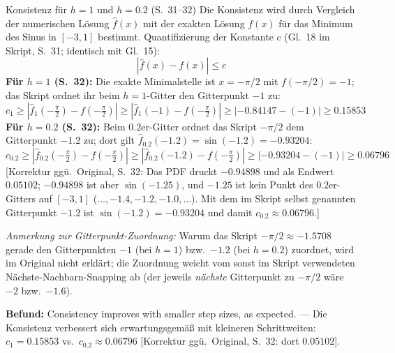 \begin{bspbox}{Konsistenz für $h=1$ und $h=0.2$ (S.~31--32)}
Die Konsistenz wird durch Vergleich der numerischen Lösung $\hat{f}(x)$ mit der exakten Lösung $f(x)$ für das Minimum des Sinus in $[-3,1]$ bestimmt. Quantifizierung der Konstante $c$ (Gl.~18 im Skript, S.~31; identisch mit Gl.~15):
\[ \left| \hat{f}(x) - f(x) \right| \leq c \tag{Gl.~18} \]
\textbf{Für $h=1$ (S.~32):} Die exakte Minimalstelle ist $x = -\pi/2$ mit $f(-\pi/2) = -1$; das Skript ordnet ihr beim $h=1$-Gitter den Gitterpunkt $-1$ zu:
\[ c_1 \geq \left| \hat{f}_1\!\left(-\tfrac{\pi}{2}\right) - f\!\left(-\tfrac{\pi}{2}\right) \right| \geq \left| \hat{f}_1(-1) - f\!\left(-\tfrac{\pi}{2}\right) \right| \geq |-0.84147 - (-1)| \geq 0.15853 \]
\textbf{Für $h=0.2$ (S.~32):} Beim $0.2$er-Gitter ordnet das Skript $-\pi/2$ dem Gitterpunkt $-1.2$ zu; dort gilt $\hat{f}_{0.2}(-1.2) = \sin(-1.2) = -0.93204$:
\[ c_{0.2} \geq \left| \hat{f}_{0.2}\!\left(-\tfrac{\pi}{2}\right) - f\!\left(-\tfrac{\pi}{2}\right) \right| \geq \left| \hat{f}_{0.2}(-1.2) - f\!\left(-\tfrac{\pi}{2}\right) \right| \geq |-0.93204 - (-1)| \geq 0.06796 \]
[Korrektur ggü.\ Original, S.~32: Das PDF druckt $-0.94898$ und als Endwert $0.05102$; $-0.94898$ ist aber $\sin(-1.25)$, und $-1.25$ ist kein Punkt des $0.2$er-Gitters auf $[-3,1]$ ($\ldots,-1.4,-1.2,-1.0,\ldots$). Mit dem im Skript selbst genannten Gitterpunkt $-1.2$ ist $\sin(-1.2) = -0.93204$ und damit $c_{0.2} \approx 0.06796$.]

\emph{Anmerkung zur Gitterpunkt-Zuordnung:} Warum das Skript $-\pi/2 \approx -1.5708$ gerade den Gitterpunkten $-1$ (bei $h=1$) bzw.\ $-1.2$ (bei $h=0.2$) zuordnet, wird im Original nicht erklärt; die Zuordnung weicht vom sonst im Skript verwendeten Nächste-Nachbarn-Snapping ab (der jeweils \emph{nächste} Gitterpunkt zu $-\pi/2$ wäre $-2$ bzw.\ $-1.6$).

\textbf{Befund:} \glqq Consistency improves with smaller step sizes, as expected.\grqq{} — Die Konsistenz verbessert sich erwartungsgemäß mit kleineren Schrittweiten: $c_1 = 0.15853$ vs.\ $c_{0.2} \approx 0.06796$ [Korrektur ggü.\ Original, S.~32: dort $0.05102$].
\end{bspbox}

